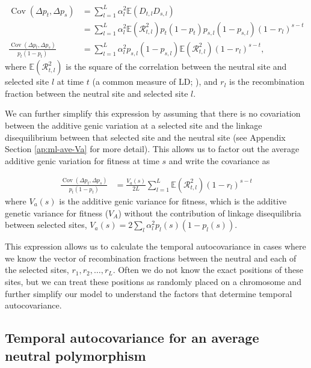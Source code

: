 \documentclass[11pt]{article}
\newcommand{\nnn}{\nonumber}
\newcommand{\E}{\mathbb{E}}
\DeclareMathOperator{\cov}{Cov}
\begin{document}
\begin{subequations}
  \begin{align}
    \cov(\Delta p_t, \Delta p_s) &= \sum_{l=1}^L \alpha_{l}^2 \E(D_{t,l} D_{s,l}) \nnn \\
                                 &= \sum_{l=1}^L \alpha_{l}^2 \E(\mathcal{R}_{t,l}^2) p_t (1-p_t) p_{s,l} (1-p_{s,l}) (1-r_l)^{s-t}  \\
    \frac{\cov(\Delta p_t, \Delta p_s)}{p_t (1-p_t)} &= \sum_{l=1}^L \alpha_{l}^2 p_{s,l} (1-p_{s,l}) \E(\mathcal{R}_{t,l}^2) (1-r_l)^{s-t}, 
  \end{align} 
\end{subequations}
%
where $\E(\mathcal{R}^2_{t,l})$ is the square of the correlation between the
neutral site and selected site $l$ at time $t$ (a common measure of LD;
\cite{Hill1968-ue}), and $r_l$ is the recombination fraction between the
neutral site and selected site $l$.

We can further simplify this expression by assuming that there is no
covariation between the additive genic variation at a selected site and the
linkage disequilibrium between that selected site and the neutral site (see
Appendix Section \ref{ap:ml-ave-Va} for more detail). This allows us to factor
out the average additive genic variation for fitness at time $s$ and write the
covariance as

\begin{align}
  \frac{\cov(\Delta p_t, \Delta p_s)}{p_t(1-p_t) } &= \frac{V_a(s)}{2L} \sum_{l=1}^L \E(\mathcal{R}_{t,l}^2) (1-r_l)^{s-t}
  \label{eq:multilocus-cov-sum}
\end{align}
%
where $V_a(s)$ is the additive genic variance for fitness, which is the
additive genetic variance for fitness ($V_A$) without the contribution of
linkage disequilibria between selected sites, $V_a(s) = 2 \sum_l \alpha_l^2
p_l(s) (1-p_l(s))$.

This expression allows us to calculate the temporal autocovariance in cases
where we know the vector of recombination fractions between the neutral and
each of the selected sites, $r_1, r_2, \ldots, r_L$. Often we do not know the
exact positions of these sites, but we can treat these positions as randomly
placed on a chromosome and further simplify our model to understand the factors
that determine temporal autocovariance.

\subsection{Temporal autocovariance for an average neutral polymorphism}
\end{document}
